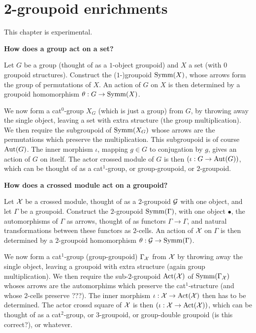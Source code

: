 

\section{2-groupoid enrichments}

This chapter is experimental. 

\bigskip
\noindent
{\bf How does a group act on a set?}

Let $G$ be a group (thought of as a $1$-object groupoid) 
and $X$ a set (with $0$ groupoid structures). 
Construct the ($1$-)groupoid $\mathrm{Symm}(X)$, 
whose arrows form the group of permutations of $X$.
An action of $G$ on $X$ is then determined by a groupoid homomorphism 
$\theta : G \to \mathrm{Symm}(X)$.

We now form a cat$^0$-group $X_G$ (which is just a group) from $G$, 
by throwing away the single object, 
leaving a set with extra structure (the group multiplication). 
We then require the subgroupoid of $\mathrm{Symm}(X_G)$ whose arrows 
are the permutations which preserve the multiplication. 
This subgroupoid is of course $\mathrm{Aut}(G)$. 
The inner morphism $\iota$, mapping $g \in G$ to conjugation by $g$, 
gives an action of $G$ on itself. 
The actor crossed module of $G$ is then $(\iota : G \to \mathrm{Aut}(G))$, 
which can be thought of as a cat$^1$-group, 
or group-groupoid, or $2$-groupoid.

\bigskip\noindent
{\bf How does a crossed module act on a groupoid?} 

Let $\mathcal{X}$ be a crossed module, 
thought of as a $2$-groupoid $\mathcal{G}$ with one object, 
and let $\Gamma$ be a groupoid. 
Construct the $2$-groupoid $\mathrm{Symm}(\Gamma)$, with one object $\bullet$, 
the automorphisms of $\Gamma$ as arrows, 
thought of as functors $\Gamma \to \Gamma$, 
and natural transformations between these functors as $2$-cells. 
An action of $\mathcal{X}$ on $\Gamma$ is then determined by a 
$2$-groupoid homomorphism $\theta : \mathcal{G} \to \mathrm{Symm}(\Gamma)$.

We now form a cat$^1$-group (group-groupoid) $\Gamma_{\mathcal{X}}$ from $\mathcal{X}$ 
by throwing away the single object, 
leaving a groupoid with extra structure (again group multiplication).
We then require the sub-$2$-groupoid $\mathrm{Act}(\mathcal{X})$ 
of $\mathrm{Symm}(\Gamma_{\mathcal{X}})$ whoses arrows 
are the automorphims which preserve the cat$^1$-structure 
(and whose $2$-cells preserve ???). 
The inner morphism $\iota : \mathcal{X} \to \mathrm{Act}(\mathcal{X})$ then has to be determined.  
The actor crossd square of $\mathcal{X}$ is then 
$(\iota : \mathcal{X} \to \mathrm{Act}(\mathcal{X}))$, 
which can be thought of as a cat$^2$-group, 
or $3$-groupoid, or group-double groupoid (is this correct?), or whatever.

